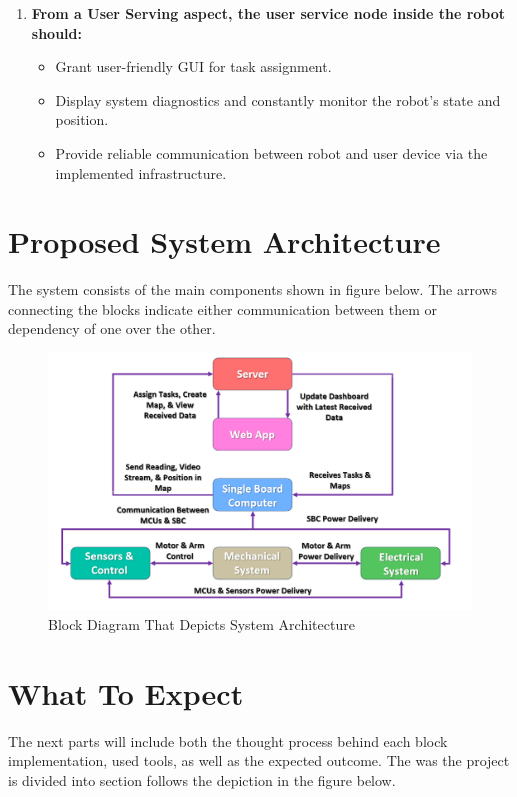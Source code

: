 \begin{enumerate}
\begin{itemize}
            \end{itemize}
    \item \textbf{From a User Serving aspect, the user service node inside the robot should:}
            \begin{itemize}
                \item Grant user-friendly GUI for task assignment.
                \item Display system diagnostics and constantly monitor the robot's state and position.
                \item Provide reliable communication between robot and user device via the implemented infrastructure.
                
            \end{itemize}
\end{enumerate}


\section{Proposed System Architecture}
The system consists of the main components shown in figure below. The arrows connecting the blocks indicate either communication between them or dependency of one over the other.
\begin{figure}[h!]
	\centering
	\includegraphics[scale=0.3]{./Figures/Intro/Capture.PNG}
	\caption{Block Diagram That Depicts System Architecture}
	\label{fig:sysarch}
\end{figure}

\section{What To Expect}
The next parts will include both the thought process behind each block implementation, used tools, as well as the expected outcome. The was the project is divided into section follows the depiction in the figure below.

